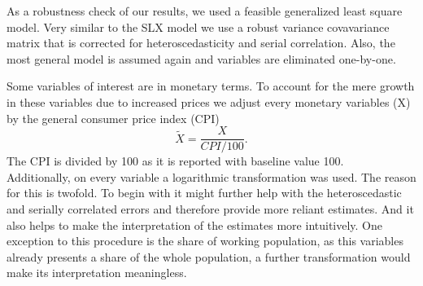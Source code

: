 \documentclass[]{article}
\begin{document}
As a robustness check of our results, we used a feasible generalized least square model. Very similar to the SLX model we use a robust variance covavariance matrix that is corrected for heteroscedasticity and serial correlation. Also, the most general model is assumed again and variables are eliminated one-by-one.\par
Some variables of interest are in monetary terms. To account for the mere growth in these variables due to increased prices we adjust every monetary variables (X) by the general consumer price index (CPI)
$$\widetilde{X} = \frac{X}{CPI/100}.$$
The CPI is divided by 100 as it is reported with baseline value 100.\\
Additionally, on every variable a logarithmic transformation was used. The reason for this is twofold. To begin with it might further help with the heteroscedastic and serially correlated errors and therefore provide more reliant estimates. And it also helps to make the interpretation of the estimates more intuitively. One exception to this procedure is the share of working population, as this variables already presents a share of the whole population, a further transformation would make its interpretation meaningless.\\
\end{document}
